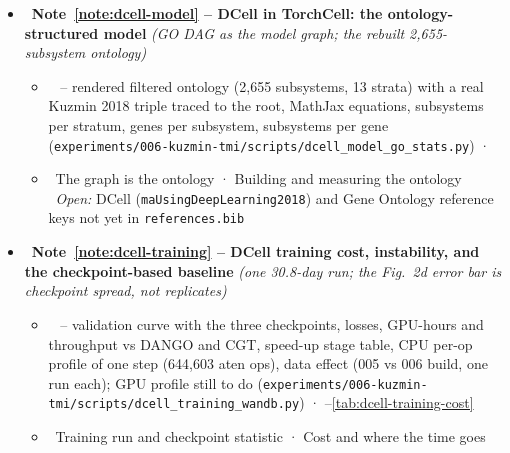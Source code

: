 \begin{itemize}
\begin{itemize}
      \item {}\ Dataset builds · Training and result · Release and dataset effects · Prediction and channel weights · What the ReZero gate carries · Ablation of the reconstruction loss and the ReZero gate \quad {}\ \emph{Open:} no DANGO or DCell run on the experiment-010 build (the like-for-like baseline)
    \end{itemize}
  \item {}\ \textbf{Note~\ref{note:dcell-model} -- DCell in TorchCell: the ontology-structured model} \emph{(GO DAG as the model graph; the rebuilt 2,655-subsystem ontology)}
    \begin{itemize}\setlength{\itemsep}{0pt}
      \item {}\  -- rendered filtered ontology (2,655 subsystems, 13 strata) with a real Kuzmin 2018 triple traced to the root, MathJax equations, subsystems per stratum, genes per subsystem, subsystems per gene (\texttt{experiments/006-kuzmin-tmi/scripts/dcell\_model\_go\_stats.py}) · 
      \item {}\ The graph is the ontology · Building and measuring the ontology \quad {}\ \emph{Open:} DCell (\texttt{maUsingDeepLearning2018}) and Gene Ontology reference keys not yet in \texttt{references.bib}
    \end{itemize}
  \item {}\ \textbf{Note~\ref{note:dcell-training} -- DCell training cost, instability, and the checkpoint-based baseline} \emph{(one 30.8-day run; the Fig.~2d error bar is checkpoint spread, not replicates)}
    \begin{itemize}\setlength{\itemsep}{0pt}
      \item {}\  -- validation curve with the three checkpoints, losses, GPU-hours and throughput vs DANGO and CGT, speed-up stage table, CPU per-op profile of one step (644,603 aten ops), data effect (005 vs 006 build, one run each); GPU profile still to do (\texttt{experiments/006-kuzmin-tmi/scripts/dcell\_training\_wandb.py}) · --\ref{tab:dcell-training-cost}
      \item {}\ Training run and checkpoint statistic · Cost and where the time goes
    \end{itemize}


\end{itemize}
